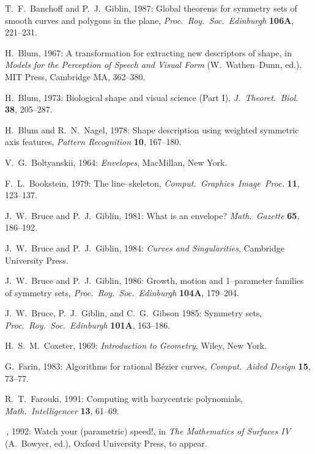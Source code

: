 \begin{thebibliography}{99}

T.~F.~Banchoff and P.~J.~Giblin, 1987: Global theorems for
symmetry sets of smooth curves and polygons in the plane,
{\it Proc.\ Roy.\ Soc.\ Edinburgh\/} {\bf 106A}, 221--231.

H.~Blum, 1967: A transformation for extracting new descriptors
of shape, in {\it Models for the Perception of Speech and Visual
Form\/} (W.~Wathen--Dunn, ed.), MIT Press, Cambridge MA, 362--380.

H.~Blum, 1973: Biological shape and visual science (Part I),
{\it J.\ Theoret.\ Biol.} {\bf 38}, 205--287.

H.~Blum and R.~N.~Nagel, 1978: Shape description using weighted
symmetric axis features, {\it Pattern Recognition\/} {\bf 10},
167--180.

V.~G.~Boltyanskii, 1964: {\it Envelopes}, MacMillan, New York.

F.~L.~Bookstein, 1979: The line--skeleton, {\it Comput.\ Graphics\
Image\ Proc.} {\bf 11}, 123--137.

J.~W.~Bruce and P.~J.~Giblin, 1981: What is an envelope? {\it
Math.\ Gazette\/} {\bf 65}, 186--192.

J.~W.~Bruce and P.~J.~Giblin, 1984: {\em Curves and Singularities},
Cambridge University Press.

J.~W.~Bruce and P.~J.~Giblin, 1986: Growth, motion and 1--parameter
families of symmetry sets, {\it Proc.\ Roy.\ Soc.\ Edinburgh\/}
{\bf 104A}, 179--204.

J.~W.~Bruce, P.~J.~Giblin, and C.~G.~Gibson 1985: Symmetry sets,
{\it Proc.\ Roy.\ Soc.\ Edinburgh\/} {\bf 101A}, 163--186.

H.~S.~M.~Coxeter, 1969: {\it Introduction to Geometry}, Wiley,
New York.

G.~Farin, 1983: Algorithms for rational B\'ezier curves, {\it Comput.\
Aided Design\/} {\bf 15}, 73--77.

R.~T.~Farouki, 1991: Computing with barycentric polynomials, {\it Math.\
Intelligencer\/} {\bf 13}, 61--69.

\bibitem{farouki92}
\ldash\,, 1992: Watch your (parametric) speed!, in {\it The Mathematics
of Surfaces IV\/} (A.~Bowyer, ed.), Oxford University Press, to appear.


\end{thebibliography}
